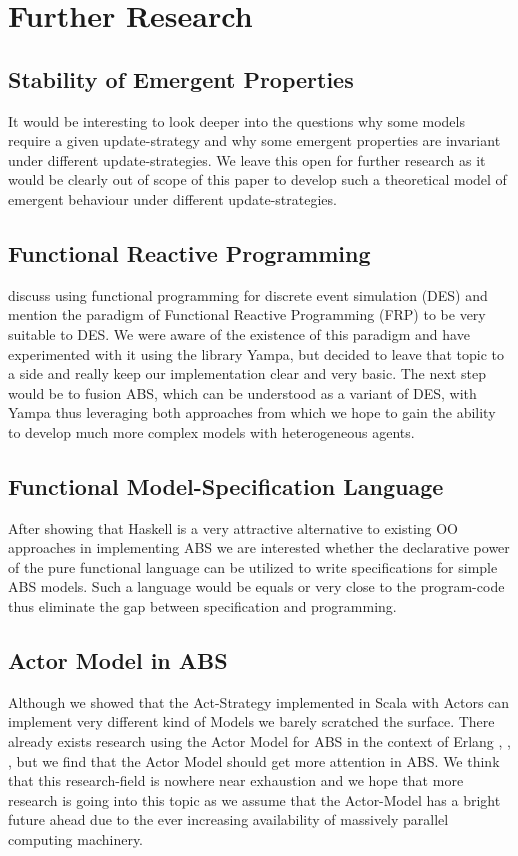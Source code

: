 \section{Further Research}

\subsection{Stability of Emergent Properties}
It would be interesting to look deeper into the questions why some models require a given update-strategy and why some emergent properties are invariant under different update-strategies. We leave this open for further research as it would be clearly out of scope of this paper to develop such a theoretical model of emergent behaviour under different update-strategies. 

\subsection{Functional Reactive Programming}
\cite{jankovic_functional_2007} discuss using functional programming for discrete event simulation (DES) and mention the paradigm of Functional Reactive Programming (FRP) to be very suitable to DES. We were aware of the existence of this paradigm and have experimented with it using the library Yampa, but decided to leave that topic to a side and really keep our implementation clear and very basic. The next step would be to fusion ABS, which can be understood as a variant of DES, with Yampa thus leveraging both approaches from which we hope to gain the ability to develop much more complex models with heterogeneous agents.

\subsection{Functional Model-Specification Language}
After showing that Haskell is a very attractive alternative to existing OO approaches in implementing ABS we are interested whether the declarative power of the pure functional language can be utilized to write specifications for simple ABS models. Such a language would be equals or very close to the program-code thus eliminate the gap between specification and programming.

\subsection{Actor Model in ABS}
Although we showed that the Act-Strategy implemented in Scala with Actors can implement very different kind of Models we barely scratched the surface. There already exists research using the Actor Model for ABS in the context of Erlang \cite{varela_modelling_2004}, \cite{di_stefano_using_2005}, \cite{di_stefano_exat:_2007}, \cite{sher_agent-based_2013} but we find that the Actor Model should get more attention in ABS. We think that this research-field is nowhere near exhaustion and we hope that more research is going into this topic as we assume that the Actor-Model has a bright future ahead due to the ever increasing availability of massively parallel computing machinery.